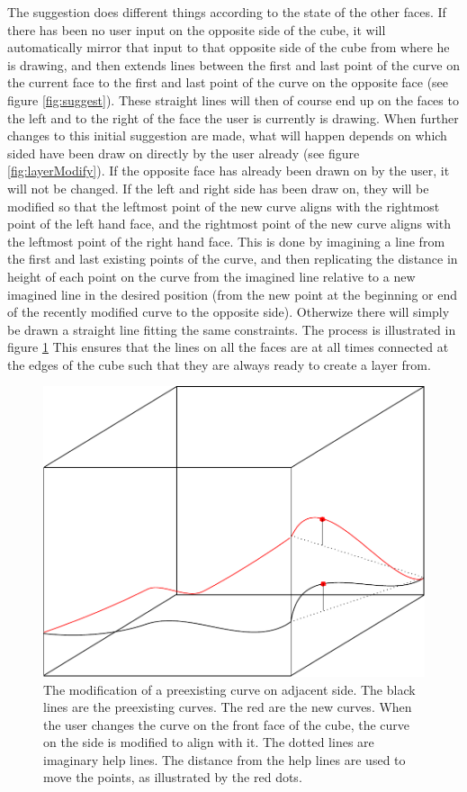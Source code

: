 \documentclass[a4paper,12pt]{report}
\begin{document}
The suggestion does different things according to the state of the other faces. If there has been no user input on the opposite side of the cube, it will automatically mirror that input to that opposite side of the cube from where he is drawing, and then extends lines between the first and last point of the curve on the current face to the first and last point of the curve on the opposite face (see figure \ref{fig:suggest}). These straight lines will then of course end up on the faces to the left and to the right of the face the user is currently is drawing. When further changes to this initial suggestion are made, what will happen depends on which sided have been draw on directly by the user already (see figure \ref{fig:layerModify}). If the opposite face has already been drawn on by the user, it will not be changed. If the left and right side has been draw on, they will be modified so that the leftmost point of the new curve aligns with the rightmost point of the left hand face, and the rightmost point of 
the new curve aligns with the leftmost point of the right hand face.
 This is done by imagining a line from the first and last existing points of the curve, and then replicating the distance in height of each point on the curve from the imagined line relative to a new imagined line in the desired position (from the new point at the beginning or end of the recently modified curve to the opposite side). Otherwize there will simply be drawn a straight line fitting the same 
constraints. The process is illustrated in figure \ref{fig:changeSide} This ensures that the lines on all the faces are at all times connected at the edges of the cube such that they are always ready to create a layer from.

\begin{figure}
\centering
\includegraphics[width=.8\linewidth]{thesis/changeSide.pdf}
 \caption{The modification of a preexisting curve on adjacent side. The black lines are the preexisting curves. The red are the new curves. When the user changes the curve on the front face of the cube, the curve on the side is modified to align with it. The dotted lines are imaginary help lines. The distance from the help lines are used to move the points, as illustrated by the red dots.}
 \label{fig:changeSide}
\end{figure}
\end{document}
